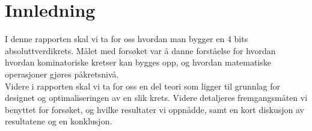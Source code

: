 \section{Innledning}
I denne rapporten skal vi ta for oss hvordan man bygger en 4 bits absoluttverdikrets. Målet med forsøket var å danne forståelse for hvordan hvordan kominatoriske kretser kan bygges opp, og hvordan matematiske operasjoner gjøres påkretsnivå.\\

Videre i rapporten skal vi ta for oss en del teori som ligger til grunnlag for designet og optimaliseringen av en slik krets. Videre detaljeres fremgangsmåten vi benyttet for forsøket, og hvilke resultater vi oppnådde, samt en kort diskusjon av resultatene og en konklusjon.
